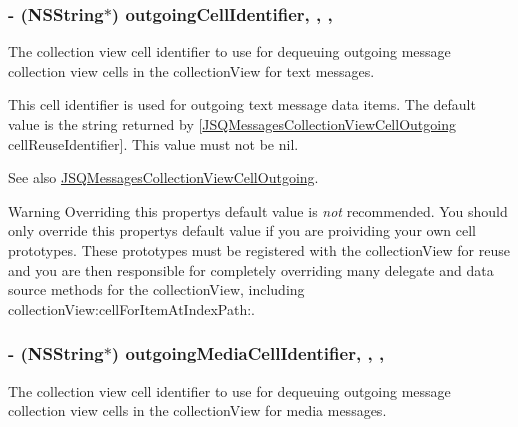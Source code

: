\subsubsection[{outgoing\+Cell\+Identifier}]{\setlength{\rightskip}{0pt plus 5cm}-\/ (N\+S\+String$\ast$) outgoing\+Cell\+Identifier\hspace{0.3cm}{\ttfamily [read]}, {\ttfamily [write]}, {\ttfamily [nonatomic]}, {\ttfamily [copy]}}\label{interface_j_s_q_messages_view_controller_af805e4fee4497e23cde6032f2af76aa7}
The collection view cell identifier to use for dequeuing outgoing message collection view cells in the collection\+View for text messages.

This cell identifier is used for outgoing text message data items. The default value is the string returned by {\ttfamily \mbox{[}\hyperlink{interface_j_s_q_messages_collection_view_cell_outgoing}{J\+S\+Q\+Messages\+Collection\+View\+Cell\+Outgoing} cell\+Reuse\+Identifier\mbox{]}}. This value must not be {\ttfamily nil}.

\begin{DoxySeeAlso}{See also}
\hyperlink{interface_j_s_q_messages_collection_view_cell_outgoing}{J\+S\+Q\+Messages\+Collection\+View\+Cell\+Outgoing}.
\end{DoxySeeAlso}
\begin{DoxyWarning}{Warning}
Overriding this property\textquotesingle{}s default value is {\itshape not} recommended. You should only override this property\textquotesingle{}s default value if you are proividing your own cell prototypes. These prototypes must be registered with the collection\+View for reuse and you are then responsible for completely overriding many delegate and data source methods for the collection\+View, including {\ttfamily collection\+View\+:cell\+For\+Item\+At\+Index\+Path\+:}. 
\end{DoxyWarning}
\hypertarget{interface_j_s_q_messages_view_controller_a1cff2419947e6c239c78206477b5223a}{}
\subsubsection[{outgoing\+Media\+Cell\+Identifier}]{\setlength{\rightskip}{0pt plus 5cm}-\/ (N\+S\+String$\ast$) outgoing\+Media\+Cell\+Identifier\hspace{0.3cm}{\ttfamily [read]}, {\ttfamily [write]}, {\ttfamily [nonatomic]}, {\ttfamily [copy]}}\label{interface_j_s_q_messages_view_controller_a1cff2419947e6c239c78206477b5223a}
The collection view cell identifier to use for dequeuing outgoing message collection view cells in the collection\+View for media messages.


